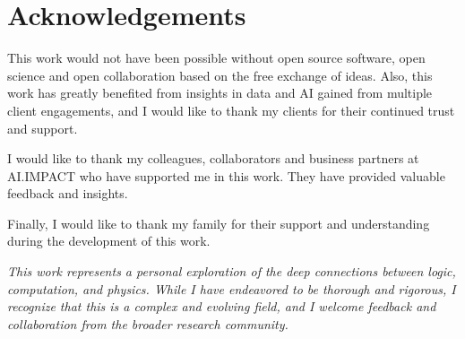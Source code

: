 \section*{Acknowledgements}

This work would not have been possible without open source software, open science and open collaboration based on the free exchange of ideas. Also, this work has greatly benefited from insights in data and AI gained from multiple client engagements, and I would like to thank my clients for their continued trust and support.

I would like to thank my colleagues, collaborators and business partners at AI.IMPACT who have supported me in this work. They have provided valuable feedback and insights.

Finally, I would like to thank my family for their support and understanding during the development of this work. 

\vspace{1em}

\textit{This work represents a personal exploration of the deep connections between logic, computation, and physics. While I have endeavored to be thorough and rigorous, I recognize that this is a complex and evolving field, and I welcome feedback and collaboration from the broader research community.}
